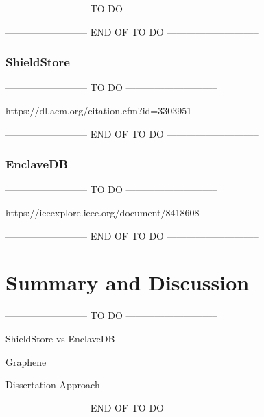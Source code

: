 -------------------------- TO DO -----------------------------

-------------------------- END OF TO DO -----------------------------


\subsubsection{ShieldStore}

-------------------------- TO DO -----------------------------

https://dl.acm.org/citation.cfm?id=3303951

-------------------------- END OF TO DO -----------------------------

\subsubsection{EnclaveDB}

-------------------------- TO DO -----------------------------

https://ieeexplore.ieee.org/document/8418608

-------------------------- END OF TO DO -----------------------------






\section{Summary and Discussion}

-------------------------- TO DO -----------------------------

ShieldStore vs EnclaveDB

Graphene

Dissertation Approach


-------------------------- END OF TO DO -----------------------------





